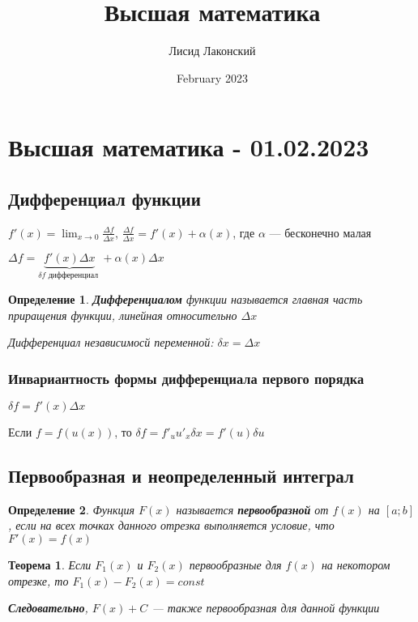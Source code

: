 \documentclass{article}
\title{Высшая математика}
\author{Лисид Лаконский}
\date{February 2023}
\newtheorem{definition}{Определение}
\newtheorem{theorem}{Теорема}
\begin{document}
\raggedright

\maketitle

\tableofcontents
\pagebreak

\section{Высшая математика - 01.02.2023}

\subsection{Дифференциал функции}

$f'(x) = \lim_{x \to 0} \frac{\Delta f}{\Delta x}$, $\frac{\Delta f}{\Delta x} = f'(x) + \alpha(x)$, где $\alpha$ — бесконечно малая

$\Delta f = \underbrace{f'(x) \Delta x}_{\delta f \text{ дифференциал }} + \alpha (x) \Delta x$

\begin{definition}
\textbf{Дифференциалом} функции называется главная часть приращения функции, линейная относительно $\Delta x$

Дифференциал независимосй переменной: $\delta x = \Delta x$
\end{definition}

\subsubsection{Инвариантность формы дифференциала первого порядка}

$\delta f = f'(x) \Delta x$

Если $f = f(u(x))$, то $\delta f = f'_u u'_x \delta x = f'(u) \delta u$

\subsection{Первообразная и неопределенный интеграл}

\begin{definition}
Функция $F(x)$ называется \textbf{первообразной} от $f(x)$ на $[a; b]$, если на всех точках данного отрезка выполняется условие, что $F'(x) = f(x)$
\end{definition}

\begin{theorem}
Если $F_1(x)$ и $F_2(x)$ первообразные для $f(x)$ на некотором отрезке, то $F_1(x) - F_2(x) = const$

\textbf{Следовательно}, $F(x) + C$ — также первообразная для данной функции 
\end{theorem}
\end{document}

